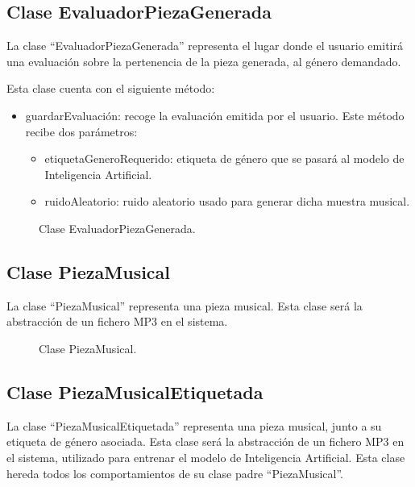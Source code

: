 \subsection{Clase EvaluadorPiezaGenerada}

La clase ``EvaluadorPiezaGenerada'' representa el lugar donde el usuario emitirá una evaluación sobre la pertenencia de la pieza generada, al género demandado.

Esta clase cuenta con el siguiente método:

\begin{itemize}
    \item guardarEvaluación: recoge la evaluación emitida por el usuario. Este método recibe dos parámetros:
    \begin{itemize}
        \item etiquetaGeneroRequerido: etiqueta de género que se pasará al modelo de Inteligencia Artificial.
        \item ruidoAleatorio: ruido aleatorio usado para generar dicha muestra musical.
    \end{itemize}
\end{itemize}

\begin{figure}[H]
  \centering
  
  \caption{Clase EvaluadorPiezaGenerada.}
\end{figure}

\subsection{Clase PiezaMusical}

La clase ``PiezaMusical'' representa una pieza musical. Esta clase será la abstracción de un fichero MP3 en el sistema.

\begin{figure}[H]
  \centering
  
  \caption{Clase PiezaMusical.}
\end{figure}

\subsection{Clase PiezaMusicalEtiquetada}

La clase ``PiezaMusicalEtiquetada'' representa una pieza musical, junto a su etiqueta de género asociada. Esta clase será la abstracción de un fichero MP3 en el sistema, utilizado para entrenar el modelo de Inteligencia Artificial. Esta clase hereda todos los comportamientos de su clase padre ``PiezaMusical''.

